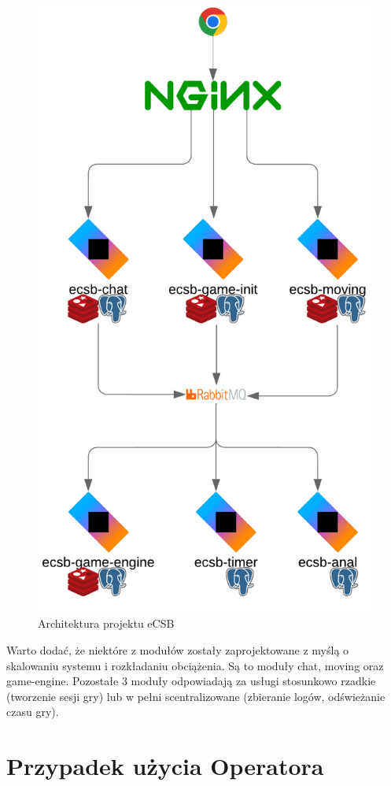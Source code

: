 \documentclass[polish]{aghengthesis}
\begin{document}
\begin{figure}[h!]
    \centering
    \includegraphics[width=0.8\linewidth]{resources/ecsb-schema.png}
    \caption{Architektura projektu eCSB}
    \label{fig:schema}
\end{figure}

\newpage
Warto dodać, że niektóre z modułów zostały zaprojektowane z myślą o skalowaniu systemu i rozkładaniu obciążenia. Są to moduły chat, moving oraz game-engine. Pozostałe 3 moduły odpowiadają za usługi stosunkowo rzadkie (tworzenie sesji gry) lub w pełni scentralizowane (zbieranie logów, odświeżanie czasu gry). 

\section{Przypadek użycia Operatora}
\end{document}
